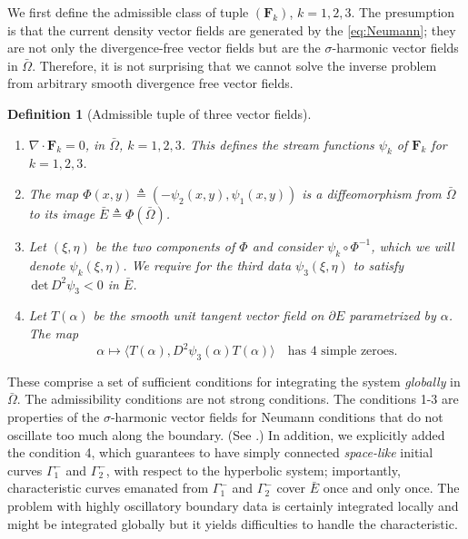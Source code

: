\documentclass[a4paper,11pt]{article}
\def\det{\,\textrm{det}\,}
\def\F{\mathbf{F}}
\newtheorem{definition}{Definition}[section]
\begin{document}
We first define the admissible class of tuple $(\F_k)$, $k=1,2,3$. The presumption is that the current density vector fields are generated by the \eqref{eq:Neumann}; they are not only the divergence-free vector fields but are the $\sigma$-harmonic vector fields in $\bar\Omega$. Therefore, it is not surprising that we cannot solve the inverse problem from arbitrary smooth divergence free vector fields.
\begin{definition}[Admissible tuple of three vector fields]
 \begin{enumerate}
  \item $\nabla\cdot \F_k = 0$, in $\bar\Omega$, $k=1,2,3$. This defines the stream functions $\psi_k$ of $\F_k$ for $k=1,2,3$.
  \item The map $\Phi(x,y)\triangleq (-\psi_2(x,y),\psi_1(x,y))$ is a diffeomorphism from $\bar\Omega$ to its image $\bar{E} \triangleq \Phi(\bar\Omega)$.
  \item Let $(\xi,\eta)$ be the two components of $\Phi$ and consider $\psi_k\circ\Phi^{-1}$, which we will denote $\psi_k(\xi,\eta)$. We require for the third data $\psi_3(\xi,\eta)$ to satisfy $\det D^2 \psi_3 < 0$ in $\bar{E}$.
  \item Let $T(\alpha)$ be the smooth unit tangent vector field on $\partial E$ parametrized by $\alpha$. The map
  $$\alpha \mapsto \langle T(\alpha),D^2\psi_3(\alpha)T(\alpha)\rangle   \quad \text{has $4$ simple zeroes}.$$
 \end{enumerate}
\end{definition}
These comprise a set of sufficient conditions for integrating the system {\it globally} in $\bar\Omega$. The admissibility conditions are not strong conditions. The conditions 1-3 are properties of the $\sigma$-harmonic vector fields for  Neumann conditions that do not oscillate too much along the boundary. (See \cite{lee_well-posedness_2014}.)  In addition, we explicitly added the condition 4, which guarantees to have simply connected {\it space-like} initial curves $\Gamma_1^-$ and $\Gamma_2^-$, with respect to the hyperbolic system; importantly, characteristic curves emanated from  $\Gamma_1^-$ and $\Gamma_2^-$ cover $\bar{E}$ once and only once. The problem with highly oscillatory boundary data is certainly integrated locally and might be integrated globally but it yields difficulties to handle the characteristic.
\end{document}
